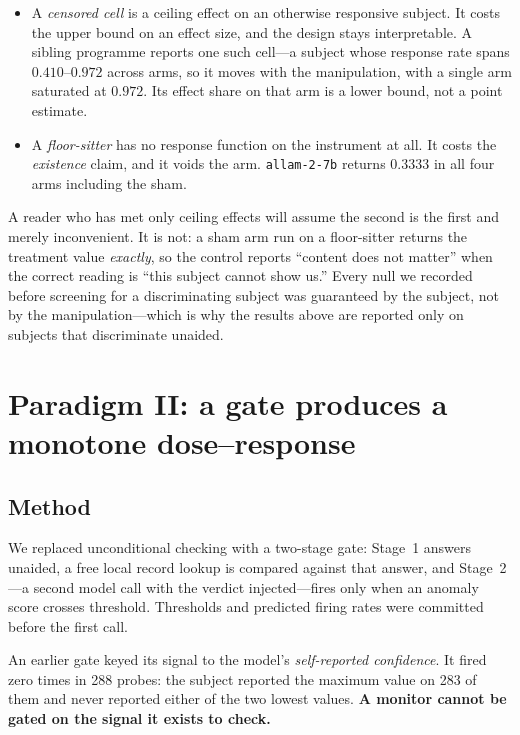 \documentclass[11pt]{article}
\begin{document}
\begin{itemize}\itemsep1pt
\item A \emph{censored cell} is a ceiling effect on an otherwise responsive
subject. It costs the upper bound on an effect size, and the design stays
interpretable. A sibling programme reports one such cell---a subject whose
response rate spans $0.410$--$0.972$ across arms, so it moves with the
manipulation, with a single arm saturated at $0.972$. Its effect share on that
arm is a lower bound, not a point estimate.
\item A \emph{floor-sitter} has no response function on the instrument at all.
It costs the \emph{existence} claim, and it voids the arm. \texttt{allam-2-7b}
returns $0.3333$ in all four arms including the sham.
\end{itemize}

\noindent
A reader who has met only ceiling effects will assume the second is the first
and merely inconvenient. It is not: a sham arm run on a floor-sitter returns
the treatment value \emph{exactly}, so the control reports ``content does not
matter'' when the correct reading is ``this subject cannot show us.'' Every null we recorded before screening for a discriminating
subject was guaranteed by the subject, not by the manipulation---which is why
the results above are reported only on subjects that discriminate unaided.

\section{Paradigm II: a gate produces a monotone dose--response}

\subsection{Method}

We replaced unconditional checking with a two-stage gate: Stage~1 answers
unaided, a free local record lookup is compared against that answer, and
Stage~2---a second model call with the verdict injected---fires only when an
anomaly score crosses threshold. Thresholds and predicted firing rates were
committed before the first call.

An earlier gate keyed its signal to the model's \emph{self-reported
confidence}. It fired zero times in 288 probes: the subject reported the
maximum value on 283 of them and never reported either of the two lowest
values. \textbf{A monitor cannot be gated on the signal it exists to check.}
\end{document}
